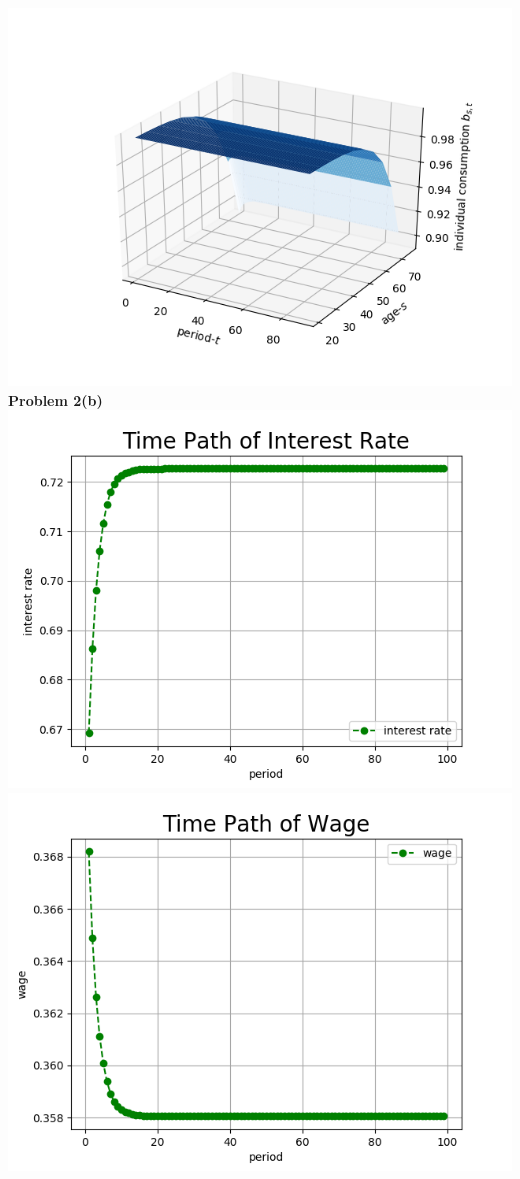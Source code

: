 \documentclass[letterpaper,12pt]{article}
\theoremstyle{definition}
\begin{document}
\includegraphics[scale=0.35]{images_TPI/bpath}
\\
\noindent\textbf{Problem 2(b)}\\
\includegraphics[scale=0.35]{images_TPI/tpi_r}
\includegraphics[scale=0.35]{images_TPI/tpi_w}
\end{document}
